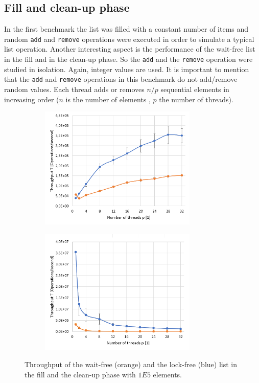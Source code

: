 \documentclass[a4paper, 12pt]{article}
\begin{document}
\subsection{Fill and clean-up phase}
In the first benchmark the list was filled with a constant number of items and random \verb|add| and \verb|remove| operations were executed in order to simulate a typical list operation. Another interesting aspect is the performance of the wait-free list in the fill and in the clean-up phase. So the \verb|add| and the \verb|remove| operation were studied in isolation. Again, integer values are used. It is important to mention that the \verb|add| and \verb|remove| operations in this benchmark do not add/remove random values. Each thread adds or removes $n/p$ sequential elements in increasing order ($n$ is the number of elements , $p$ the number of threads).

\begin{figure} [h!]
\begin{subfigure}[c]{0.45\textwidth}
\includegraphics[width=7.5cm]{tp_fill.png}
\centering
{}
\end{subfigure}
\begin{subfigure}[c]{0.45\textwidth}
\includegraphics[width=7.5cm]{tp_cleanup.png}
\centering
{}
\end{subfigure}
\caption{Throughput of the wait-free (orange) and the lock-free (blue) list in the fill and the clean-up phase with $1E5$ elements.}
\label{tp}
\end{figure}
\end{document}

